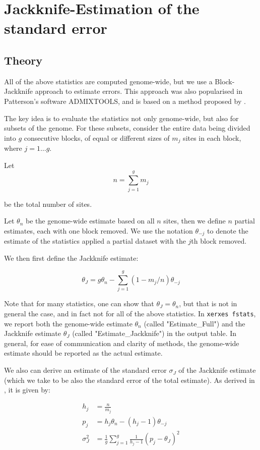 \documentclass{article}
\begin{document}
\section{Jackknife-Estimation of the standard error}

\subsection{Theory}
All of the above statistics are computed genome-wide, but we use a Block-Jackknife approach to estimate errors. This approach was also popularised in Patterson's software ADMIXTOOLS, and is based on a method proposed by \cite{Busing1999-ev}.

The key idea is to evaluate the statistics not only genome-wide, but also for subsets of the genome. For these subsets, consider the entire data being divided into $g$ consecutive blocks, of equal or different sizes of $m_j$ sites in each block, where $j=1\ldots g$.

Let 
$$n = \sum_{j=1}^g m_j$$

be the total number of sites.

Let $\theta_n$ be the genome-wide estimate based on all $n$ sites, then we define $n$ partial estimates, each with one block removed. We use the notation $\theta_{-j}$ to denote the estimate of the statistics applied a partial dataset with the $j$th block removed.

We then first define the Jackknife estimate:

$$\theta_J = g \theta_n - \sum_{j=1}^g (1 - m_j / n) \theta_{-j}$$

Note that for many statistics, one can show that $\theta_J=\theta_n$, but that is not in general the case, and in fact not for all of the above statistics. In \texttt{xerxes fstats}, we report both the genome-wide estimate $\theta_n$ (called "Estimate\_Full") and the Jackknife estimate $\theta_J$ (called "Estimate\_Jackknife") in the output table. In general, for ease of communication and clarity of methods, the genome-wide estimate should be reported as the actual estimate.

We also can derive an estimate of the standard error $\sigma_J$ of the Jackknife estimate (which we take to be also the standard error of the total estimate). As derived in \cite{Busing1999-ev}, it is given by:

\begin{equation}
\begin{split}
h_j &= \frac{n}{m_j}\\
p_j &= h_j \theta_n - (h_j - 1) \theta_{-j}\\
\sigma_J^2 &= \frac{1}{g} \sum_{j=1}^g \frac{1}{h_j - 1} (p_j - \theta_J)^2
\end{split}
\end{equation}
\end{document}
